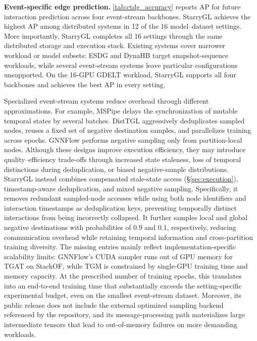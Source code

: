 \noindent\textbf{Event-specific edge prediction.} 
\autoref{tab:ctdg_accuracy} reports AP for future interaction
prediction across four event-stream backbones.
StarryGL achieves the highest AP among distributed systems in
12 of the 16 model--dataset settings. More importantly,
StarryGL completes all 16 settings through the same
distributed storage and execution stack. Existing systems cover
narrower workload or model subsets: ESDG and DynaHB target
snapshot-sequence workloads, while several event-stream systems leave
particular configurations unsupported. On the 16-GPU GDELT workload,
StarryGL supports all four backbones and achieves the best AP in every
setting.

Specialized event-stream systems reduce overhead through different
approximations. For example, MSPipe delays the synchronization of
mutable temporal states by several batches. DistTGL aggressively
deduplicates sampled nodes, reuses a fixed set of negative destination
samples, and parallelizes training across epochs. GNNFlow performs
negative sampling only from partition-local nodes. Although these
designs improve execution efficiency, they may introduce
quality--efficiency trade-offs through increased state staleness,
loss of temporal distinctions during deduplication, or biased
negative-sample distributions. StarryGL instead combines compensated
stale-state access (\S\ref{sec:execution}), timestamp-aware
deduplication, and mixed negative sampling. Specifically, it removes
redundant sampled-node accesses while using both node identifiers and
interaction timestamps as deduplication keys, preventing temporally
distinct interactions from being incorrectly collapsed. It further
samples local and global negative destinations with probabilities of
0.9 and 0.1, respectively, reducing communication overhead while
retaining temporal information and cross-partition training diversity.
 The missing entries mainly reflect
implementation-specific scalability limits: GNNFlow's CUDA sampler
runs out of GPU memory for TGAT on StackOF, while TGM is constrained
by single-GPU training time and memory capacity. At the prescribed number of training epochs, this
translates into an end-to-end training time that substantially exceeds
the setting-specific experimental budget, even on the smallest
event-stream dataset. Moreover, its public release does not include the external
optimized sampling backend referenced by the repository, and its
message-processing path materializes large intermediate tensors that
lead to out-of-memory failures on more demanding workloads.
